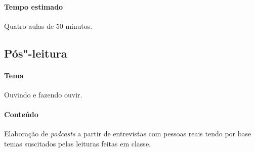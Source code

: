 \documentclass[11pt]{extarticle}
\begin{document}
   





 \paragraph{Tempo estimado} Quatro aulas de 50 minutos.


\subsection{Pós"-leitura}

 \paragraph{Tema} Ouvindo e fazendo ouvir. 

 \paragraph{Conteúdo} Elaboração de \emph{podcasts} a partir de entrevistas com
 pessoas reais tendo por base temas suscitados pelas leituras feitas em classe.
\end{document}

